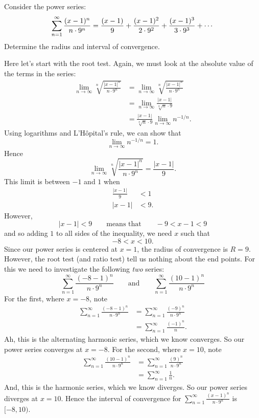 \documentclass{ximera}
\begin{document}
\begin{example}
  Consider the power series:
  \[
  \sum_{n=1}^\infty \frac{(x-1)^n}{n \cdot 9^n} = \frac{(x-1)}{9} + \frac{(x-1)^2}{2\cdot 9^2} + \frac{(x-1)^3}{3\cdot 9^3} + \cdots\\
  \]
  Determine the radius and interval of convergence.
  \begin{explanation}
    Here let's start with the root test. Again, we must look at the absolute value of the terms in the series:
    \begin{align*}
      \lim_{n\to\infty}\sqrt[n]{\frac{|x-1|^n}{n \cdot 9^n}} &= \lim_{n\to\infty}\sqrt[n]{\frac{|x-1|^n}{n \cdot 9^n}}\\
      &= \lim_{n\to\infty} \frac{|x-1|}{\sqrt[n]{n} \cdot 9}\\
      &= \frac{|x-1|}{\sqrt[n]{n} \cdot 9} \lim_{n\to\infty} n^{-1/n}.
    \end{align*}
    Using logarithms and L'H\^opital's rule, we can show that
    \[
    \lim_{n\to\infty} n^{-1/n} = 1.
    \]
    Hence
    \[
    \lim_{n\to\infty}\sqrt[n]{\frac{|x-1|^n}{n \cdot 9^n}} = \frac{|x-1|}{9}.
    \]
    This limit is between $-1$ and $1$ when
    \begin{align*}
    \frac{|x-1|}{9} &<1\\
    |x-1| &< 9.
    \end{align*}
    However,
    \[
    |x-1| < 9 \qquad\text{means that}\qquad -9 < x-1 < 9
    \]
    and so adding $1$ to all sides of the inequality, we need $x$ such that
    \[
    -8 < x < 10.
    \]
    Since our power series is centered at $x=1$, the radius of
    convergence is $R=9$. However, the root test (and ratio test) tell
    us nothing about the end points. For this we need to investigate
    the following \textit{two} series:
    \[
    \sum_{n=1}^\infty \frac{(-8-1)^n}{n \cdot 9^n}\qquad\text{and}\qquad \sum_{n=1}^\infty \frac{(10-1)^n}{n \cdot 9^n}
    \]
    For the first, where $x=-8$, note
    \begin{align*}
      \sum_{n=1}^\infty \frac{(-8-1)^n}{n \cdot 9^n} &= \sum_{n=1}^\infty \frac{(-9)^n}{n \cdot 9^n}\\
      &= \sum_{n=1}^\infty \frac{(-1)^n}{n}.
    \end{align*}
    Ah, this is the alternating harmonic series, which we know converges. So our power series converges at $x= -8$.
    For the second, where $x=10$, note
    \begin{align*}
      \sum_{n=1}^\infty \frac{(10-1)^n}{n \cdot 9^n} &= \sum_{n=1}^\infty \frac{(9)^n}{n \cdot 9^n}\\
      &= \sum_{n=1}^\infty \frac{1}{n}.
    \end{align*}
    And, this is the harmonic series, which we know diverges. So our
    power series diverges at $x= 10$. Hence the interval of
    convergence for $\sum_{n=1}^\infty \frac{(x-1)^n}{n \cdot 9^n}$ is
    $[-8,10)$.
  \end{explanation}
\end{example}
\end{document}
